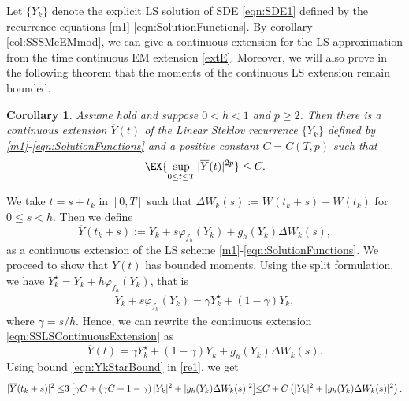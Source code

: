 \documentclass[sort&compress, preprint]{elsarticle}
\theoremstyle{definition}
\theoremstyle{plain}%
\newtheorem{corollary}{Corollary}[section]
\theoremstyle{remark}
\newcommand{\SM}{LS\xspace}
\begin{document}
	
	
Let $\{Y_k\}$ denote the explicit \SM solution of SDE \eqref{eqn:SDE1} defined by 
the recurrence equations \eqref{m1}-\eqref{eqn:SolutionFunctions}.
By corollary \ref{col:SSSMeEMmod}, we can give a continuous extension for the \SM approximation 
from the time continuous EM extension  \eqref{extE}. 
Moreover, we will also prove in the following theorem that the  moments 
of the continuous LS extension remain bounded.
\begin{corollary}\label{col:ContinuousExtBoundedMoments}
	Assume  hold and suppose  $0<h<1$ and $p\geq 
	2$. Then there is a continuous extension $\overline{Y}(t)$ of the 
	Linear Steklov recurrence $\{Y_k\}$ defined by  
	\eqref{m1}-\eqref{eqn:SolutionFunctions}  and a positive constant $C=C(T,p)$ such 
	that
	\begin{equation*}
		\EX{\sup_{0\leq t \leq T} |\overline{Y}(t)|^{2p} }
		\leq C.
	\end{equation*}
\end{corollary}
	\begin{pf}
		We take $t=s+t_k$ in $ [0,T]$ such that $\Delta W_k(s):= W(t_k+s)- W(t_k)$ for $0\leq s <h$.
		Then we define 
		\begin{equation}\label{eqn:SSLSContinuousExtension}
			\overline{Y}(t_k+s):= Y_k + s \varphi_{f_h}(Y_k) + g_h(Y_k)\Delta W_k(s),
		\end{equation}
		as a continuous extension of the \SM scheme \eqref{m1}-\eqref{eqn:SolutionFunctions}. 
		We proceed to show that $\overline{Y}(t)$ has bounded moments.
		Using the split formulation, we have $Y_k^{\star}= Y_k + h \varphi_{f_h}(Y_k)$,
		that is
		\begin{align*}
			Y_k + s \varphi_{f_h}(Y_k)=\gamma Y_k^{\star} + (1-\gamma)Y_k,
		\end{align*}
		where $\gamma = s/h$. Hence, we can rewrite the continuous extension \eqref{eqn:SSLSContinuousExtension} as
		\begin{equation}\label{re1}
			\overline{Y}(t) =
			\gamma Y^{\star}_k + (1-\gamma) Y_k +g_h(Y_k) \Delta W_k(s). %
		\end{equation}
		Using bound \eqref{eqn:YkStarBound} in \eqref{re1}, we get
		\begin{align}
			|\overline{Y}(t_k+s) |^2 
			\leq \hspace{-0.1cm}
				3\left[
					\gamma C
					+
					\left(
						\gamma C +1 - \gamma
					\right)
					|Y_k|^2
					+
					|g_h(Y_k)\Delta W_k(s)|^2
			\right] \hspace{-0.15cm}\leq\hspace{-0.1cm}
			C
			+
			C
			\left(
				|Y_k|^2 + |g_h(Y_k)\Delta W_k(s)|^2
			\right).
		\notag
		\end{align}
	\end{pf}
\end{document}
